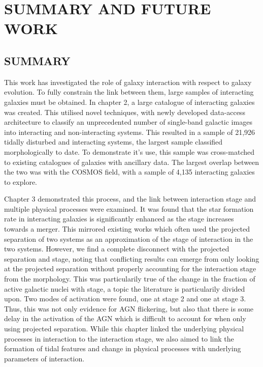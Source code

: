 \chapter{SUMMARY AND FUTURE WORK}
\section{SUMMARY}
\noindent This work has investigated the role of galaxy interaction with respect to galaxy evolution. To fully constrain the link between them, large samples of interacting galaxies must be obtained. In chapter 2, a large catalogue of interacting galaxies was created. This utilised novel techniques, with newly developed data-access architecture to classify an unprecedented number of single-band galactic images into interacting and non-interacting systems. This resulted in a sample of 21,926 tidally disturbed and interacting systems, the largest sample classified morphologically to date. To demonstrate it's use, this sample was cross-matched to existing catalogues of galaxies with ancillary data. The largest overlap between the two was with the COSMOS field, with a sample of 4,135 interacting galaxies to explore.

Chapter 3 demonstrated this process, and the link between interaction stage and multiple physical processes were examined. It was found that the star formation rate in interacting galaxies is significantly enhanced as the stage increases towards a merger. This mirrored existing works which often used the projected separation of two systems as an approximation of the stage of interaction in the two systems. However, we find a complete disconnect with the projected separation and stage, noting that conflicting results can emerge from only looking at the projected separation without properly accounting for the interaction stage from the morphology. This was particularily true of the change in the fraction of active galactic nuclei with stage, a topic the literature is particularily divided upon. Two modes of activation were found, one at stage 2 and one at stage 3. Thus, this was not only evidence for AGN flickering, but also that there is some delay in the activation of the AGN which is difficult to account for when only using projected separation. While this chapter linked the underlying physical processes in interaction to the interaction stage, we also aimed to link the formation of tidal features and change in physical processes with underlying parameters of interaction.

